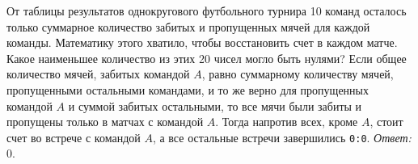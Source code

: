 \problem
От таблицы результатов однокругового футбольного турнира 10 команд осталось
только суммарное количество забитых и пропущенных мячей для каждой команды.
Математику этого хватило, чтобы восстановить счет в каждом матче.
Какое наименьшее количество из этих 20 чисел могло быть нулями?
\solution
Если общее количество мячей, забитых командой $A$, равно суммарному количеству
мячей, пропущенными остальными командами, и то же верно для пропущенных
командой $A$ и суммой забитых остальными, то все мячи были забиты и пропущены
только в матчах с командой $A$.
Тогда напротив всех, кроме $A$, стоит счет во встрече с командой $A$, а все
остальные встречи завершились \texttt{0:0}.
\emph{Ответ:} 0.
\endproblem
